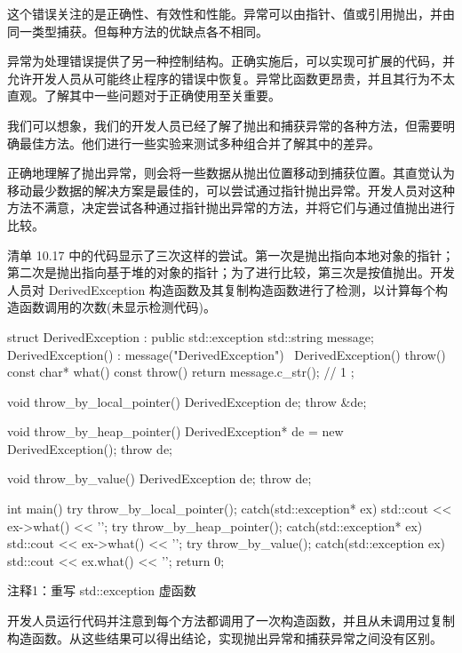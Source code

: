 这个错误关注的是正确性、有效性和性能。异常可以由指针、值或引用抛出，并由同一类型捕获。但每种方法的优缺点各不相同。

异常为处理错误提供了另一种控制结构。正确实施后，可以实现可扩展的代码，并允许开发人员从可能终止程序的错误中恢复。异常比函数更昂贵，并且其行为不太直观。了解其中一些问题对于正确使用至关重要。


我们可以想象，我们的开发人员已经了解了抛出和捕获异常的各种方法，但需要明确最佳方法。他们进行一些实验来测试多种组合并了解其中的差异。

正确地理解了抛出异常，则会将一些数据从抛出位置移动到捕获位置。其直觉认为移动最少数据的解决方案是最佳的，可以尝试通过指针抛出异常。开发人员对这种方法不满意，决定尝试各种通过指针抛出异常的方法，并将它们与通过值抛出进行比较。

清单 10.17 中的代码显示了三次这样的尝试。第一次是抛出指向本地对象的指针；第二次是抛出指向基于堆的对象的指针；为了进行比较，第三次是按值抛出。开发人员对 DerivedException 构造函数及其复制构造函数进行了检测，以计算每个构造函数调用的次数(未显示检测代码)。


\begin{cpp}
struct DerivedException : public std::exception {
  std::string message;
  DerivedException() : message("DerivedException") {}
  ~DerivedException() throw() {}
  const char* what() const throw() { return message.c_str(); } // 1
};

void throw_by_local_pointer() {
  DerivedException de;
  throw &de;
}

void throw_by_heap_pointer() {
  DerivedException* de = new DerivedException();
  throw de;
}

void throw_by_value() {
  DerivedException de;
  throw de;
}

int main() {
  try {
    throw_by_local_pointer();
  } catch(std::exception* ex) {
    std::cout << ex->what() << '\n';
  }
  try {
    throw_by_heap_pointer();
  } catch(std::exception* ex) {
    std::cout << ex->what() << '\n';
  }
  try {
    throw_by_value();
  } catch(std::exception ex) {
    std::cout << ex.what() << '\n';
  }
  return 0;
}
\end{cpp}

{\footnotesize
注释1：重写 std::exception 虚函数
}

开发人员运行代码并注意到每个方法都调用了一次构造函数，并且从未调用过复制构造函数。从这些结果可以得出结论，实现抛出异常和捕获异常之间没有区别。

